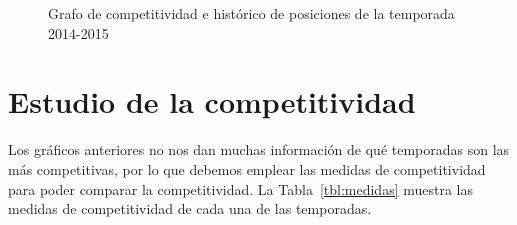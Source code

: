 \begin{figure}[htbp]
\centering
{}
\caption[Competitividad de la temporada 2014-2015]{Grafo de competitividad e histórico de posiciones de la temporada 2014-2015} \label{fig:grafo-2014-2015}
\end{figure}

\clearpage

\section{Estudio de la competitividad}

Los gráficos anteriores no nos dan muchas información de qué temporadas son las más competitivas, por lo que debemos emplear las medidas de competitividad para poder comparar la competitividad. La Tabla~\ref{tbl:medidas} muestra las medidas de competitividad de cada una de las temporadas.

